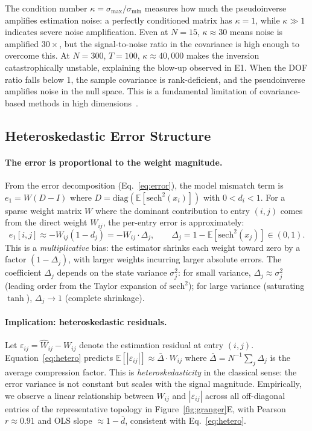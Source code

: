 \documentclass{article}
\begin{document}
The condition number $\kappa = \sigma_{\max}/\sigma_{\min}$ measures how much the pseudoinverse amplifies estimation noise: a perfectly conditioned matrix has $\kappa = 1$, while $\kappa \gg 1$ indicates severe noise amplification.
Even at $N{=}15$, $\kappa \approx 30$ means noise is amplified $30\times$, but the signal-to-noise ratio in the covariance is high enough to overcome this.
At $N{=}300$, $T{=}100$, $\kappa \approx 40{,}000$ makes the inversion catastrophically unstable, explaining the blow-up observed in E1.
When the DOF ratio falls below 1, the sample covariance is rank-deficient, and the pseudoinverse amplifies noise in the null space.
This is a fundamental limitation of covariance-based methods in high dimensions~\citep{ledoit2004well}.

\subsection{Heteroskedastic Error Structure}
\label{sec:app_hetero}

\paragraph{The error is proportional to the weight magnitude.}
From the error decomposition (Eq.~\eqref{eq:error}), the model mismatch term is $e_1 = W(D-I)$ where $D = \mathrm{diag}(\mathbb{E}[\mathrm{sech}^2(x_i)])$ with $0 < d_i < 1$.
For a sparse weight matrix $W$ where the dominant contribution to entry $(i,j)$ comes from the direct weight $W_{ij}$, the per-entry error is approximately:
\begin{equation}
    e_1[i,j] \approx -W_{ij}(1 - d_j) = -W_{ij} \cdot \Delta_j, \qquad \Delta_j = 1 - \mathbb{E}[\mathrm{sech}^2(x_j)] \in (0,1).
    \label{eq:hetero}
\end{equation}
This is a \emph{multiplicative} bias: the estimator shrinks each weight toward zero by a factor $(1-\Delta_j)$, with larger weights incurring larger absolute errors.
The coefficient $\Delta_j$ depends on the state variance $\sigma_j^2$: for small variance, $\Delta_j \approx \sigma_j^2$ (leading order from the Taylor expansion of $\mathrm{sech}^2$); for large variance (saturating $\tanh$), $\Delta_j \to 1$ (complete shrinkage).

\paragraph{Implication: heteroskedastic residuals.}
Let $\varepsilon_{ij} = \hat{W}_{ij} - W_{ij}$ denote the estimation residual at entry $(i,j)$.
Equation~\eqref{eq:hetero} predicts $\mathbb{E}[|\varepsilon_{ij}|] \approx \bar{\Delta} \cdot W_{ij}$ where $\bar{\Delta} = N^{-1}\sum_j \Delta_j$ is the average compression factor.
This is \emph{heteroskedasticity} in the classical sense: the error variance is not constant but scales with the signal magnitude.
Empirically, we observe a linear relationship between $W_{ij}$ and $|\varepsilon_{ij}|$ across all off-diagonal entries of the representative topology in Figure~\ref{fig:granger}E, with Pearson $r \approx 0.91$ and OLS slope $\approx 1-\bar{d}$, consistent with Eq.~\eqref{eq:hetero}.
\end{document}
